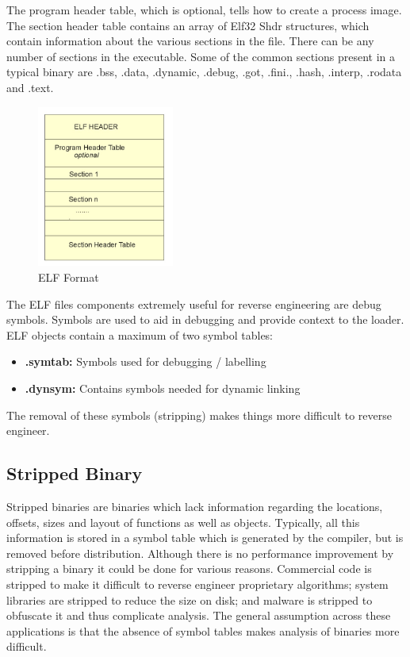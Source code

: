 \documentclass{article}
\begin{document}
The program header table, which is optional, tells how to create a process image. The section header table 
contains an array of Elf32 Shdr structures, which contain information about the various sections in the file. 
There can be any number of sections in the executable. Some of the common sections present in a typical binary 
are .bss, .data, .dynamic, .debug, .got, .fini., .hash, .interp, .rodata and .text. \citep{stripped}
\begin{figure}[H]
\centering
\includegraphics[width=0.4\textwidth]{img/ELF_Format.jpg}
\caption{ELF Format}
\label{fig:elf}
\end{figure}
The ELF files components extremely useful for reverse engineering are debug symbols. Symbols are used
to aid in debugging and provide context to the loader. ELF objects contain a maximum of two symbol tables:
\begin{itemize}
\item{\textbf{.symtab:}} Symbols used for debugging / labelling
\item{\textbf{.dynsym:}} Contains symbols needed for dynamic linking
\end{itemize}
The removal of these symbols (stripping) makes things more difficult to reverse engineer.

\subsection{Stripped Binary}

Stripped binaries are binaries which lack information regarding the locations, offsets, sizes and layout of functions 
as well as objects. Typically, all this information is stored in a symbol table which is generated by the compiler, 
but is removed before distribution. Although there is no performance improvement by stripping a binary it 
could be done for various reasons. Commercial code is stripped to make it difficult to reverse engineer proprietary 
algorithms; system libraries are stripped to reduce the size on disk; and malware is stripped to obfuscate it and 
thus complicate analysis. The general assumption across these applications is that the absence of symbol tables 
makes analysis of binaries more difficult. \citep{stripped}
\end{document}
